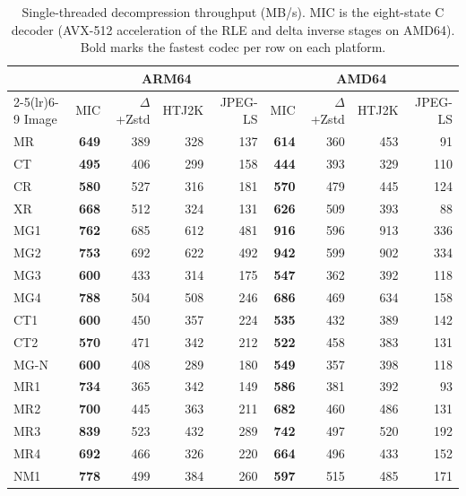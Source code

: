 \documentclass[journal]{IEEEtran}
\begin{document}
\begin{table}[htbp]
\centering
\caption{Single-threaded decompression throughput (MB/s). MIC is
the eight-state C decoder (AVX-512 acceleration of the RLE and delta
inverse stages on AMD64). Bold marks the fastest codec per row on
each platform.}
\label{tab:decomp}
\scriptsize
\begin{tabular}{l|rrrr|rrrr}
\toprule
 & \multicolumn{4}{c|}{ARM64} & \multicolumn{4}{c}{AMD64} \\
\cmidrule(lr){2-5}\cmidrule(lr){6-9}
Image & MIC & $\Delta$+Zstd & HTJ2K & JPEG-LS & MIC & $\Delta$+Zstd & HTJ2K & JPEG-LS \\
\midrule
MR             & \textbf{649} & 389 & 328 & 137 & \textbf{614} & 360 & 453 & 91 \\
CT             & \textbf{495} & 406 & 299 & 158 & \textbf{444} & 393 & 329 & 110 \\
CR             & \textbf{580} & 527 & 316 & 181 & \textbf{570} & 479 & 445 & 124 \\
XR             & \textbf{668} & 512 & 324 & 131 & \textbf{626} & 509 & 393 & 88 \\
MG1            & \textbf{762} & 685 & 612 & 481 & \textbf{916} & 596 & 913 & 336 \\
MG2            & \textbf{753} & 692 & 622 & 492 & \textbf{942} & 599 & 902 & 334 \\
MG3            & \textbf{600} & 433 & 314 & 175 & \textbf{547} & 362 & 392 & 118 \\
MG4            & \textbf{788} & 504 & 508 & 246 & \textbf{686} & 469 & 634 & 158 \\
CT1            & \textbf{600} & 450 & 357 & 224 & \textbf{535} & 432 & 389 & 142 \\
CT2            & \textbf{570} & 471 & 342 & 212 & \textbf{522} & 458 & 383 & 131 \\
MG-N           & \textbf{600} & 408 & 289 & 180 & \textbf{549} & 357 & 398 & 118 \\
MR1            & \textbf{734} & 365 & 342 & 149 & \textbf{586} & 381 & 392 & 93 \\
MR2            & \textbf{700} & 445 & 363 & 211 & \textbf{682} & 460 & 486 & 131 \\
MR3            & \textbf{839} & 523 & 432 & 289 & \textbf{742} & 497 & 520 & 192 \\
MR4            & \textbf{692} & 466 & 326 & 220 & \textbf{664} & 496 & 433 & 152 \\
NM1            & \textbf{778} & 499 & 384 & 260 & \textbf{597} & 515 & 485 & 171 \\

\end{tabular}
\end{table}
\end{document}
